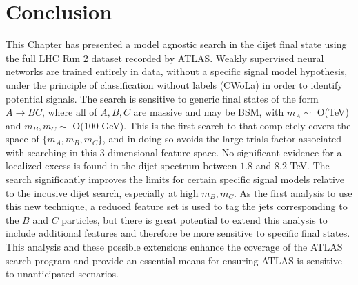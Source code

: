 \section{Conclusion}
\label{sec:CWoLa:conclusion}
This Chapter has presented a model agnostic search in the dijet final state using the full LHC Run 2 dataset recorded by ATLAS.
Weakly supervised neural networks are trained entirely in data, without a specific signal model hypothesis, under the principle of classification without labels (CWoLa) in order to identify potential signals.
The search is sensitive to generic final states of the form $A\rightarrow BC$, where all of $A,B,C$ are massive and may be BSM, with $m_A\sim$ O(TeV) and $m_B,m_C\sim$ O(100 GeV).
This is the first search to that completely covers the space of $\{m_A,m_B,m_C\}$, and in doing so avoids the large trials factor associated with searching in this 3-dimensional feature space.
No significant evidence for a localized excess is found in the dijet spectrum between $1.8$ and $8.2$ TeV.
The search significantly improves the limits for certain specific signal models relative to the incusive dijet search, especially at high $m_B,m_C$.
As the first analysis to use this new technique, a reduced feature set is used to tag the jets corresponding to the $B$ and $C$ particles, but there is great potential to extend this analysis to include additional features and therefore be more sensitive to specific final states.
This analysis and these possible extensions enhance the coverage of the ATLAS search program and provide an essential means for ensuring ATLAS is sensitive to unanticipated scenarios.
